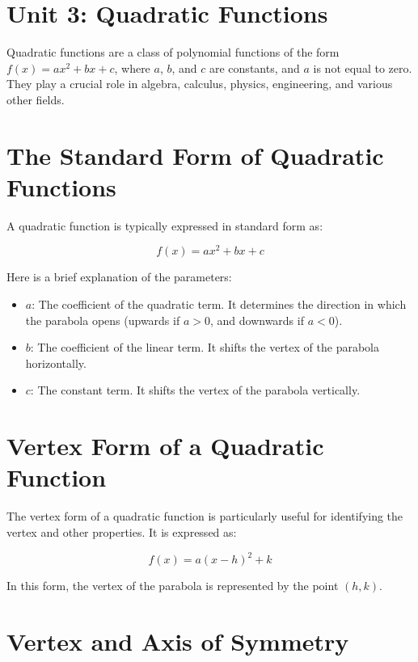 \documentclass[12pt,a4paper]{article}
\begin{document}
\section*{Unit 3: Quadratic Functions}
Quadratic functions are a class of polynomial functions of the form $f(x) = ax^2 + bx + c$, where $a$, $b$, and $c$ are constants, and $a$ is not equal to zero. They play a crucial role in algebra, calculus, physics, engineering, and various other fields. 
\section{The Standard Form of Quadratic Functions}

A quadratic function is typically expressed in standard form as:

\begin{equation}
f(x) = ax^2 + bx + c
\end{equation}

Here is a brief explanation of the parameters:

\begin{itemize}
    \item $a$: The coefficient of the quadratic term. It determines the direction in which the parabola opens (upwards if $a > 0$, and downwards if $a < 0$).
    \item $b$: The coefficient of the linear term. It shifts the vertex of the parabola horizontally.
    \item $c$: The constant term. It shifts the vertex of the parabola vertically.
\end{itemize}

\section{Vertex Form of a Quadratic Function}

The vertex form of a quadratic function is particularly useful for identifying the vertex and other properties. It is expressed as:

\begin{equation}
f(x) = a(x - h)^2 + k
\end{equation}

In this form, the vertex of the parabola is represented by the point $(h, k)$.
\newpage
\section{Vertex and Axis of Symmetry}
\end{document}
